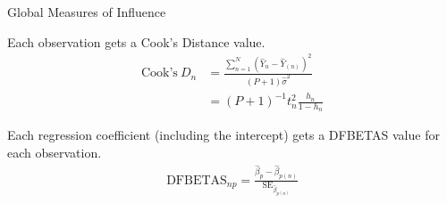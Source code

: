 \documentclass[10pt]{beamer}\usepackage[]{graphicx}\usepackage[]{color}
\begin{document}

\begin{frame}{Global Measures of Influence}

  Each observation gets a Cook's Distance value.
  \begin{align*}
    \textrm{Cook's} ~ D_n &= \frac{\sum_{n = 1}^N \left( \hat{Y}_n - \hat{Y}_{(n)} \right)^2}{\left(P + 1\right) \hat{\sigma}^2}\\[6pt]
                          &= (P + 1)^{-1} t_n^2 \frac{h_n}{1 - h_n}
  \end{align*}

  Each regression coefficient (including the intercept) gets a DFBETAS value for
  each observation.
  \begin{align*}
    \textrm{DFBETAS}_{np} = \frac{\hat{\beta}_p - \hat{\beta}_{p(n)}}{\textrm{SE}_{\hat{\beta}_{p(n)}}}
  \end{align*}

\end{frame}

\watermarkoff %
\end{document}

